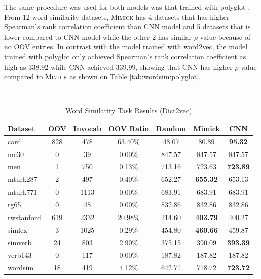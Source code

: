     The same procedure was used for both models was that trained with
    polyglot \citep{polyglot2013alrfou}. From 12 word similarity
    datasets, \textsc{Mimick} has 4 datasets that has higher
    Spearman's rank correlation coefficient than CNN model and 5
    datasets that is lower compared to CNN model while the other 2 has
    similar $\rho$ value because of no OOV entries. In contrast with
    the model trained with word2vec, the model trained with polyglot
    \citep{polyglot2013alrfou} only achieved Spearman's rank
    correlation coefficient as high as $338.92$ while CNN achieved $339.99$,
    showing that CNN has higher
    $\rho$ value compared to \textsc{Mimick} as shown on Table
    \ref{tab:wordsim:polyglot}.

    \begin{table}[!ht]
      \begin{threeparttable} 
      \begin{center}
        \caption{Word Similarity Task Results (Dict2vec)}
        ~\\
        \label{tab:wordsim:dict2vec}
        \begin{tabular}{l|c|c|c|c|c|c}
          \textbf{Dataset} & \textbf{OOV} & \textbf{Invocab} &
          \textbf{OOV Ratio} & \textbf{Random}\tnote{*} &
          \textbf{Mimick}\tnote{*} & \textbf{CNN}\tnote{*}\\
          \hline
          card & 828 & 478 & 63.40\% & 48.07 & 80.89 & \textbf{95.32}\\
          mc30 & 0 & 39 & 0.00\% & 847.57 & 847.57 & 847.57\\
          men & 1 & 750 & 0.13\% & 713.16 & 723.63 & \textbf{723.89}\\
          mturk287 & 2 & 497 & 0.40\% & 652.27 & \textbf{655.32} & 653.13\\
          mturk771 & 0 & 1113 & 0.00\% & 683.91 & 683.91 & 683.91\\
          rg65 & 0 & 48 & 0.00\% & 832.86 & 832.86 & 832.86\\
          rwstanford & 619 & 2332 & 20.98\% & 214.60 & \textbf{403.79} & 400.27\\
          simlex & 3 & 1025 & 0.29\% & 454.80 & \textbf{460.66} & 459.87\\
          simverb & 24 & 803 & 2.90\% & 375.15 & 390.09 & \textbf{393.39}\\
          verb143 & 0 & 117 & 0.00\% & 187.82 & 187.82 & 187.82\\
          wordsim & 18 & 419 & 4.12\% & 642.71 & 718.72 & \textbf{723.72}\\

\end{tabular}
\end{center}
\end{threeparttable}
\end{table}
